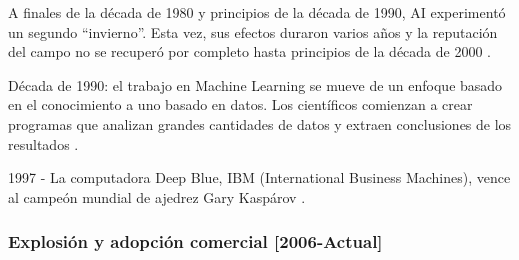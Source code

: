 A finales de la década de 1980 y principios de la década de 1990, AI experimentó un segundo ``invierno''. Esta vez, sus efectos duraron varios años y la reputación del campo no se recuperó por completo hasta principios de la década de 2000 \cite{V.Gonzalez}.
\\ \par
Década de 1990: el trabajo en Machine Learning se mueve de un enfoque basado en el conocimiento a uno basado en datos. Los científicos comienzan a crear programas que analizan grandes cantidades de datos y extraen conclusiones de los resultados \cite{V.Gonzalez}.
\\ \par
1997 - La computadora Deep Blue, IBM (International Business Machines), vence al campeón mundial de ajedrez Gary Kaspárov \cite{V.Gonzalez}. 
\\ \par
\subsubsection{Explosión y adopción comercial [2006-Actual]}

